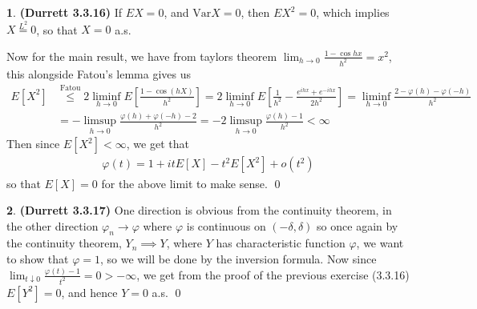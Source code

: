 \documentclass{article}
\theoremstyle{definition}
\newtheorem{pb}{}
\newcommand{\var}{\text{Var}}
\begin{document}
    \begin{pb}\textbf{(Durrett 3.3.16)}
        If \(EX = 0\), and \(\var X = 0\), then \(EX^2 = 0\), which implies \(X \overset{L^2}{=} 0\), so that \(X = 0\) a.s.

        Now for the main result, we have from taylors theorem \(\lim_{h\to 0}\frac{1 - \cos hx}{h^2} = x^2\), this alongside Fatou's lemma gives us
        \begin{align*}
            E[X^2] &\overset{\text{Fatou}}{\leq} 2\liminf_{h\to 0}E\left[\frac{1-\cos(hX)}{h^2}\right] = 2\liminf_{h\to0}E\left[\frac{1}{h^2} - \frac{e^{ihx} + e^{-ihx}}{2h^2}\right] = \liminf_{h\to 0}\frac{2 - \varphi(h) - \varphi(-h)}{h^2} \\
            &= - \limsup_{h\to 0} \frac{\varphi(h) + \varphi(-h) - 2}{h^2} = -2\limsup_{h \to 0}\frac{\varphi(h)-1}{h^2} < \infty
        \end{align*}
        Then since \(E[X^2] < \infty\), we get that
        \begin{align*}
            \varphi(t) = 1 +itE[X] -t^2E[X^2] + o(t^2)
        \end{align*} so that \(E[X] = 0\) for the above limit to make sense. \qed
    \end{pb}
    \begin{pb}\textbf{(Durrett 3.3.17)}
        One direction is obvious from the continuity theorem, in the other direction \(\varphi_n \to \varphi\) where \(\varphi\) is continuous on \((-\delta,\delta)\) so once again by the continuity theorem, \(Y_n \implies Y\), where \(Y\) has characteristic function \(\varphi\), we want to show that \(\varphi = 1\), so we will be done by the inversion formula. Now since \(\lim_{t\downarrow 0}\frac{\varphi(t) - 1}{t^2} = 0 > -\infty\), we get from the proof of the previous exercise (3.3.16) \(E[Y^2] = 0\), and hence \(Y = 0\) a.s. \qed
    \end{pb}
\end{document}
